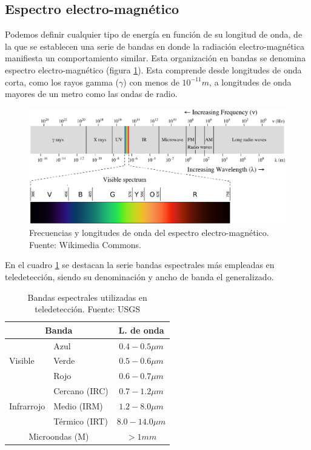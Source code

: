 \subsection{Espectro electro-magnético}
Podemos definir cualquier tipo de energía en función de su longitud de onda, de la que se establecen una serie de bandas en donde la radiación electro-magnética manifiesta un comportamiento similar. Esta organización en bandas se denomina espectro electro-magnético (figura \ref{fig:espectro}). Esta comprende desde longitudes de onda corta, como los rayos gamma ($\gamma$) con menos de $10^{-11} m$, a longitudes de onda mayores de un metro como las ondas de radio.%

\begin{figure}
	\centering	
	\includegraphics[width=0.9\linewidth]{./Imagenes/Espectro.eps}
	\caption[Espectro electro-magnético]{Frecuencias y longitudes de onda del espectro electro-magnético. Fuente: Wikimedia Commons.}
	\label{fig:espectro}
\end{figure}

En el cuadro \ref{tab:bandas} se destacan la serie bandas espectrales más empleadas en teledetección, siendo su denominación y ancho de banda el generalizado.%

\begin{table}\centering
	\begin{tabular}{@{}llc@{}}
		\toprule[0.4mm]
		\multicolumn{2}{c}{\textbf{Banda}} & \textbf{L. de onda} \\
		\midrule
		\multirow{3}{*}{Visible} & Azul & $0.4-0.5{\mu}m$ \\
		& Verde & $0.5-0.6{\mu}m$ \\
		& Rojo & $0.6-0.7{\mu}m$ \\
		\midrule
		\multirow{3}{*}{Infrarrojo} & Cercano (IRC) & $0.7-1.2{\mu}m$ \\
		& Medio (IRM) & $1.2-8.0{\mu}m$ \\
		& Térmico (IRT) & $8.0-14.0{\mu}m$ \\
		\midrule
		\multicolumn{2}{c}{Microondas (M)} & $>1mm$\\
		\bottomrule[0.4mm]
	\end{tabular}
	\caption[Bandas espectrales utilizadas en teledetección]{Bandas espectrales utilizadas en teledetección. Fuente: USGS}
	\label{tab:bandas}
\end{table}

